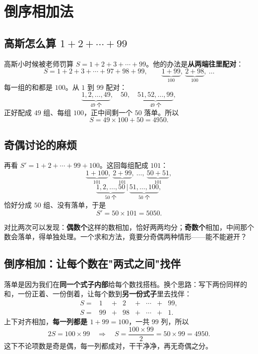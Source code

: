 \chapter{倒序相加法}

\section{\texorpdfstring{高斯怎么算 $1+2+\cdots+99$}{高斯怎么算 1+2+...+99}}

高斯小时候被老师罚算 $S=1+2+3+\cdots+99$。他的办法是\textbf{从两端往里配对}：
\[
S=1+2+3+\cdots+97+98+99,\qquad
\underbrace{1+99}_{100},\ \underbrace{2+98}_{100},\ \dots
\]
每一组的和都是 $100$。从 $1$ 到 $99$ 配对：
\[
\underbrace{1,2,\dots,49}_{\text{49 个}},\quad \boxed{50},\quad \underbrace{51,52,\dots,99}_{\text{49 个}},
\]
正好配成 $49$ 组、每组 $100$，正中间剩一个 $50$ 落单。所以
\[
S=49\times 100+50=4950.
\]

\section{奇偶讨论的麻烦}

再看 $S'=1+2+\cdots+99+100$。这回每组配成 $101$：
\[
\underbrace{1+100}_{101},\ \underbrace{2+99}_{101},\ \dots,\ \underbrace{50+51}_{101},
\]
\[
\underbrace{1,2,\dots,50}_{\text{50 个}}\,\Big|\,\underbrace{51,\dots,100}_{\text{50 个}},
\]
恰好分成 $50$ 组、没有落单，于是
\[
S'=50\times 101=5050.
\]

对比两次可以发现：\textbf{偶数个}这样的数相加，恰好两两均分；\textbf{奇数个}相加，中间那个数会落单，得单独处理。一个求和方法，竟要分奇偶两种情形——能不能避开？

\section{倒序相加：让每个数在"两式之间"找伴}

落单是因为我们在\textbf{同一个式子内部}给每个数找搭档。换个思路：写下两份同样的和，一份正着、一份倒着，让每个数到\textbf{另一份式子}里去找伴：
\[
\begin{array}{rcccccccl}
S=& 1 &+& 2 &+& \cdots &+& 99,\\
S=& 99 &+& 98 &+& \cdots &+& 1.
\end{array}
\]
上下对齐相加，\textbf{每一列都是 $1+99=100$}，一共 $99$ 列，所以
\[
2S=100\times 99\quad\Longrightarrow\quad S=\frac{100\times 99}{2}=50\times 99=4950.
\]
这下不论项数是奇是偶，每一列都成对，干干净净，再无奇偶之分。

